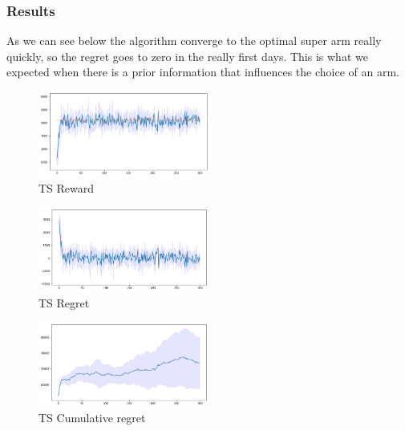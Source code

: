 \subsubsection{Results}
As we can see below the algorithm converge to the optimal super arm really quickly, so the regret goes to zero in the really first days. This is what we expected when there is a prior information that influences the choice of an arm.
\begin{figure}[ht]
    \begin{center}
    \includegraphics[width=0.5\textwidth]{img/TS3.png}
    \caption{TS Reward}
    \label{fig:reward32}
    \end{center}
\end{figure}
\begin{multicols}{2}
    \begin{figure}[H]
        \begin{center}
        \includegraphics[width=0.5\textwidth]{img/TS3_regret.png}
        \caption{TS Regret}
        \label{fig:regret32}
        \end{center}
    \end{figure}
    \columnbreak
    \begin{figure}[H]
        \begin{center}
        \includegraphics[width=0.5\textwidth]{img/TS3_cum_reg.png}
        \caption{TS Cumulative regret}
        \label{fig:cum_reg32}
        \end{center}
    \end{figure}
\end{multicols}
